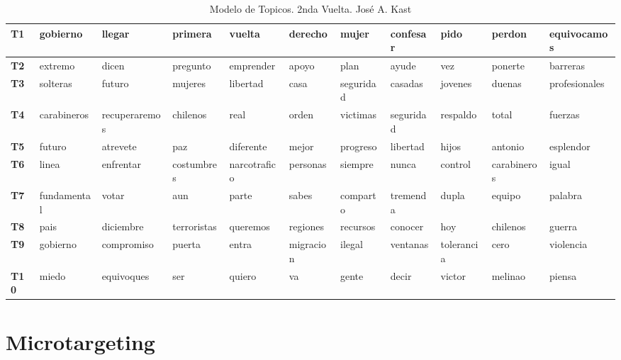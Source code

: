 \documentclass[
  10pt,
  letterpaper,
]{report}
\begin{document}
\begin{table}[!h]

\caption{\label{tab:Tabla10_kast2}Modelo de Topicos. 2nda Vuelta. José A. Kast }
\centering
\fontsize{6}{8}\selectfont
\begin{tabular}[t]{>{\raggedright\arraybackslash}p{0.08in}|>{\raggedright\arraybackslash}p{0.4in}|>{\raggedright\arraybackslash}p{0.4in}|>{\raggedright\arraybackslash}p{0.4in}|>{\raggedright\arraybackslash}p{0.4in}|>{\raggedright\arraybackslash}p{0.4in}|>{\raggedright\arraybackslash}p{0.4in}|>{\raggedright\arraybackslash}p{0.4in}|>{\raggedright\arraybackslash}p{0.4in}|>{\raggedright\arraybackslash}p{0.4in}|l}
\hline
T1 & gobierno & llegar & primera & vuelta & derecho & mujer & confesar & pido & perdon & equivocamos\\
\hline
\textbf{T2} & extremo & dicen & pregunto & emprender & apoyo & plan & ayude & vez & ponerte & barreras\\
\hline
\textbf{T3} & solteras & futuro & mujeres & libertad & casa & seguridad & casadas & jovenes & duenas & profesionales\\
\hline
\textbf{T4} & carabineros & recuperaremos & chilenos & real & orden & victimas & seguridad & respaldo & total & fuerzas\\
\hline
\textbf{T5} & futuro & atrevete & paz & diferente & mejor & progreso & libertad & hijos & antonio & esplendor\\
\hline
\textbf{T6} & linea & enfrentar & costumbres & narcotrafico & personas & siempre & nunca & control & carabineros & igual\\
\hline
\textbf{T7} & fundamental & votar & aun & parte & sabes & comparto & tremenda & dupla & equipo & palabra\\
\hline
\textbf{T8} & pais & diciembre & terroristas & queremos & regiones & recursos & conocer & hoy & chilenos & guerra\\
\hline
\textbf{T9} & gobierno & compromiso & puerta & entra & migracion & ilegal & ventanas & tolerancia & cero & violencia\\
\hline
\textbf{T10} & miedo & equivoques & ser & quiero & va & gente & decir & victor & melinao & piensa\\
\hline
\end{tabular}
\end{table}

\hypertarget{microtargeting}{%
\section{Microtargeting}\label{microtargeting}}
\end{document}
